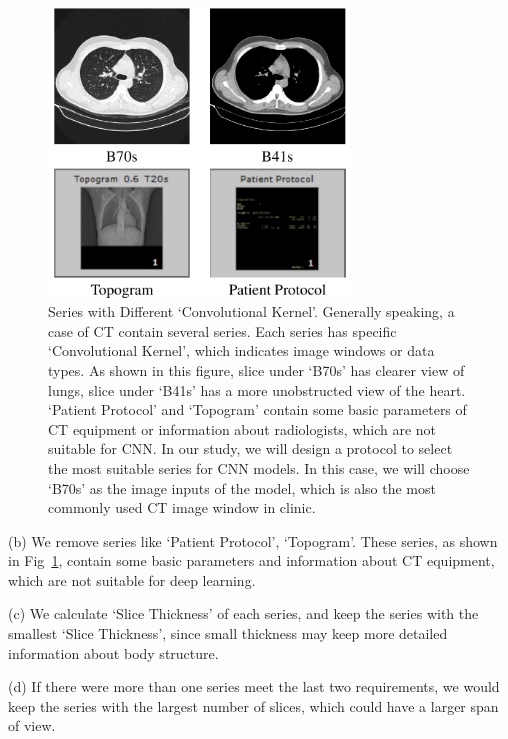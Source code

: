 \documentclass[journal]{IEEEtran}
\begin{document}
\begin{figure}[t]    
    \centerline{\includegraphics[width=80mm]{Bs.pdf}}
    \vspace{-0cm}
    \caption{Series with Different `Convolutional Kernel'. Generally speaking, a case of CT contain several series. Each series has specific `Convolutional Kernel', which indicates image windows or data types.
    As shown in this figure, slice under `B70s' has clearer view of lungs, slice under `B41s' has a more unobstructed view of the heart. `Patient Protocol' and `Topogram' contain some basic parameters of CT equipment or information about radiologists, which are not suitable for CNN.
    In our study, we will design a protocol to select the most suitable series for CNN models. In this case, we will choose `B70s' as the image inputs of the model, which is also the most commonly used CT image window in clinic.}
    \vspace{-0cm}
    \label{Bs}

    \end{figure}

(b) We remove series like `Patient Protocol', `Topogram'. These series, as shown in Fig~\ref{Bs}, contain some basic parameters and information about CT equipment, which are not suitable for deep learning.

(c) We calculate `Slice Thickness' of each series, and keep the series with the smallest `Slice Thickness', since small thickness may keep more detailed information about body structure. 

(d) If there were more than one series meet the last two requirements, we would keep the series with the largest number of slices, which could have a larger span of view.
\end{document}
